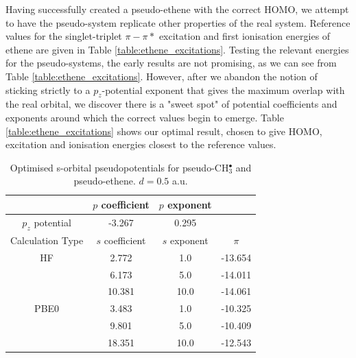 \documentclass[journal=jctcce,manuscript=article]{achemso}
\begin{document}
Having successfully created a pseudo-ethene with the correct HOMO, we attempt to have the pseudo-system replicate other properties of the real system. Reference values for the singlet-triplet \(\pi-\pi*\) excitation and first ionisation energies of ethene are given in Table \ref{table:ethene_excitations}. Testing the relevant energies for the pseudo-systems, the early results are not promising, as we can see from Table \ref{table:ethene_excitations}. However, after we abandon the notion of sticking strictly to a \(p_{z}\)-potential exponent that gives the maximum overlap with the real orbital, we discover there is a "sweet spot" of potential coefficients and exponents around which the correct values begin to emerge. Table \ref{table:ethene_excitations} shows our optimal result, chosen to give HOMO, excitation and ionisation energies closest to the reference values. 

\begin{table}[ht]
\caption{Optimised s-orbital pseudopotentials for pseudo-CH\(^{\bullet}_{3}\) and pseudo-ethene. \(d = 0.5\) a.u.}
\begin{tabular}{c c c c}
\hline
& \(p\) coefficient & \(p\) exponent \\
\hline
\(p_{z}\) potential & -3.267 & 0.295 \\
\hline
Calculation Type & \(s\) coefficient & \(s\) exponent & \(\pi\) \\
\hline\hline
HF & 2.772 & 1.0 & -13.654 \\
 & 6.173 & 5.0 & -14.011 \\
 & 10.381 & 10.0 & -14.061 \\
\hline
PBE0 & 3.483 & 1.0 & -10.325 \\
 & 9.801 & 5.0 & -10.409 \\
 & 18.351 & 10.0 & -12.543 \\
\hline
\end{tabular}
\label{table:p_potentials}
\end{table}
\end{document}
